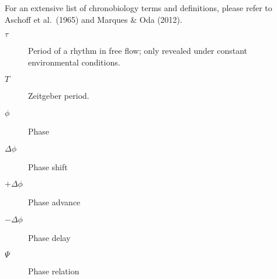 
\begin{simbolos}
For an extensive list of chronobiology terms and definitions, please
refer to Aschoff et al.~(1965) and Marques \& Oda (2012).

\begin{description}
\item[\(\tau\)]
\hspace{20cm}

Period of a rhythm in free flow; only revealed under constant
environmental conditions.
\item[\(T\)]
\hspace{20cm}

Zeitgeber period.
\item[\(\phi\)]
\hspace{20cm}

Phase
\item[\(\Delta\phi\)]
\hspace{20cm}

Phase shift
\item[\(+\Delta\phi\)]
\hspace{20cm}

Phase advance
\item[\(-\Delta\phi\)]
\hspace{20cm}

Phase delay
\item[\(\Psi\)]
\hspace{20cm}

Phase relation
\end{description}
\end{simbolos}


